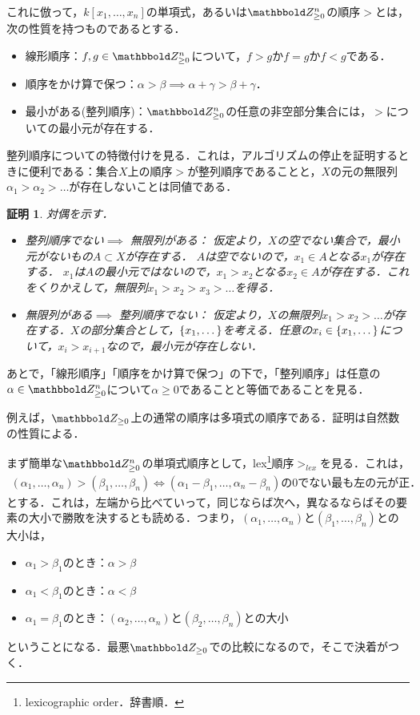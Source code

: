 \documentclass[9pt]{ltjsarticle}
\theoremstyle{break}
\theoremstyle{break}
\theoremstyle{break}
\theoremstyle{break}
\theoremstyle{break}
\theoremstyle{break}
\theoremstyle{break}
\theoremstyle{break}
\theoremstyle{break}
\theoremstyle{break}
\theoremstyle{break}
\theoremstyle{break}
\theoremstyle{break}
\theoremstyle{break}
\theoremstyle{break}
\theoremstyle{nonumberbreak}
\newtheorem{myproof}{証明}
\theoremstyle{nonumberbreak}
\begin{document}
これに倣って，$k[x_1,\dots,x_n]$の単項式，あるいは$\Zge^n$の順序$>$とは，次の性質を持つものであるとする．
\begin{itemize}
 \item 線形順序：$f,g\in \Zge^n$について，$f > g$か$f=g$か$f < g$である．
 \item 順序をかけ算で保つ：$\alpha > \beta \implies \alpha + \gamma > \beta + \gamma$．
 \item 最小がある(整列順序)：$\Zge^n$の任意の非空部分集合には，$>$についての最小元が存在する．
\end{itemize}

整列順序についての特徴付けを見る．これは，アルゴリズムの停止を証明するときに便利である：集合$X$上の順序$>$が整列順序であることと，$X$の元の無限列$\alpha_1 >  \alpha_2 > \dots$が存在しないことは同値である．
\begin{myproof}
対偶を示す．
 \begin{itemize}
  \item 整列順序でない$\implies$ 無限列がある：
仮定より，$X$の空でない集合で，最小元がないもの$A\subset X$が存在する．
$A$は空でないので，$x_1 \in A$となる$x_1$が存在する．
$x_1$は$A$の最小元ではないので，$x_1 > x_2$となる$x_2 \in A$が存在する．これをくりかえして，無限列$x_1 > x_2 > x_3 > \dots$を得る．
  \item 無限列がある$\implies$ 整列順序でない：
仮定より，$X$の無限列$x_1 > x_2 > \dots$が存在する．$X$の部分集合として，$\left\{x_1,\dots\right\}$を考える．任意の$x_i \in \left\{x_1,\dots\right\}$について，$x_i > x_{i+1}$なので，最小元が存在しない．
 \end{itemize}
\end{myproof}

あとで，「線形順序」「順序をかけ算で保つ」の下で，「整列順序」は任意の$\alpha \in \Zge^n$について$\alpha \ge 0$であることと等価であることを見る．

例えば，$\Zge$上の通常の順序は多項式の順序である．証明は自然数の性質による．

まず簡単な$\Zge^n$の単項式順序として，lex\footnote{lexicographic order．辞書順．}順序$>_{lex}$を見る．これは，
\begin{align}
(\alpha_1,\dots,\alpha_n) > (\beta_1,\dots,\beta_n)
\iff
(\alpha_1 - \beta_1,\dots,\alpha_n - \beta_n)の0でない最も左の元が正．
\end{align}
とする．これは，左端から比べていって，同じならば次へ，異なるならばその要素の大小で勝敗を決するとも読める．つまり，$(\alpha_1,\dots,\alpha_n)$と$(\beta_1,\dots,\beta_n)$との大小は，
\begin{itemize}
 \item $\alpha_1>\beta_1$のとき：$\alpha > \beta$
 \item $\alpha_1 < \beta_1$のとき：$\alpha < \beta$
 \item $\alpha_1 = \beta_1$のとき：$(\alpha_2,\dots,\alpha_n)$と$(\beta_2,\dots,\beta_n)$との大小
\end{itemize}
ということになる．最悪$\Zge$での比較になるので，そこで決着がつく．
\end{document}
